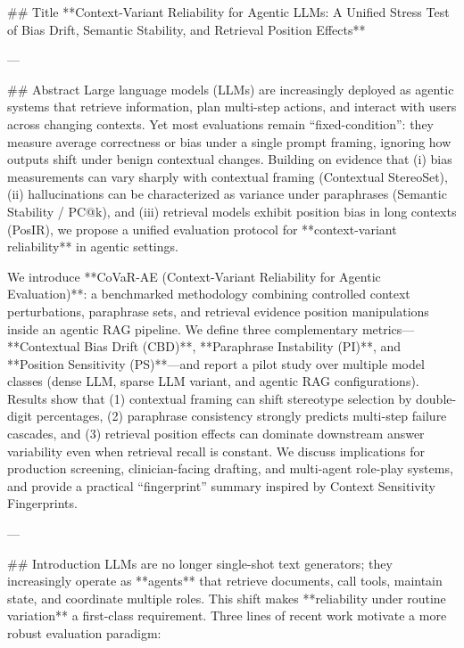 ## Title
**Context-Variant Reliability for Agentic LLMs: A Unified Stress Test of Bias Drift, Semantic Stability, and Retrieval Position Effects**

---

## Abstract
Large language models (LLMs) are increasingly deployed as agentic systems that retrieve information, plan multi-step actions, and interact with users across changing contexts. Yet most evaluations remain “fixed-condition”: they measure average correctness or bias under a single prompt framing, ignoring how outputs shift under benign contextual changes. Building on evidence that (i) bias measurements can vary sharply with contextual framing (Contextual StereoSet), (ii) hallucinations can be characterized as variance under paraphrases (Semantic Stability / PC@k), and (iii) retrieval models exhibit position bias in long contexts (PosIR), we propose a unified evaluation protocol for **context-variant reliability** in agentic settings.  

We introduce **CoVaR-AE (Context-Variant Reliability for Agentic Evaluation)**: a benchmarked methodology combining controlled context perturbations, paraphrase sets, and retrieval evidence position manipulations inside an agentic RAG pipeline. We define three complementary metrics—**Contextual Bias Drift (CBD)**, **Paraphrase Instability (PI)**, and **Position Sensitivity (PS)**—and report a pilot study over multiple model classes (dense LLM, sparse LLM variant, and agentic RAG configurations). Results show that (1) contextual framing can shift stereotype selection by double-digit percentages, (2) paraphrase consistency strongly predicts multi-step failure cascades, and (3) retrieval position effects can dominate downstream answer variability even when retrieval recall is constant. We discuss implications for production screening, clinician-facing drafting, and multi-agent role-play systems, and provide a practical “fingerprint” summary inspired by Context Sensitivity Fingerprints.

---

## Introduction
LLMs are no longer single-shot text generators; they increasingly operate as **agents** that retrieve documents, call tools, maintain state, and coordinate multiple roles. This shift makes **reliability under routine variation** a first-class requirement. Three lines of recent work motivate a more robust evaluation paradigm:

